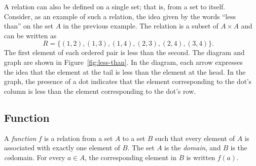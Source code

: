 A relation can also be defined on a single set; that is, from a set to itself.
Consider, as an example of such a relation, the idea given by the words ``less
than'' on the set $A$ in the previous example.  The relation is a subset of $A
\times A$ and can be written as
\begin{equation*}
   R = \{(1,2), (1,3), (1,4), (2,3), (2,4), (3,4)\}.
\end{equation*}
The first element of each ordered pair is less than the second. The diagram and
graph are shown in Figure~\ref{fig:less-than}.  In the diagram, each arrow
expresses the idea that the element at the tail is less than the element at the
head. In the graph, the presence of a dot indicates that the element
corresponding to the dot's column is less than the element corresponding to the
dot's row.

\subsection{Function}

\begin{definition}
   A \emph{function} $f$ is a relation from a set $A$ to a set $B$ such that
   every element of $A$ is associated with exactly one element of $B$. The set
   $A$ is the \emph{domain}, and $B$ is the \emph{co}domain. For every $a \in
   A$, the corresponding element in $B$ is written $f(a)$.
\end{definition}

